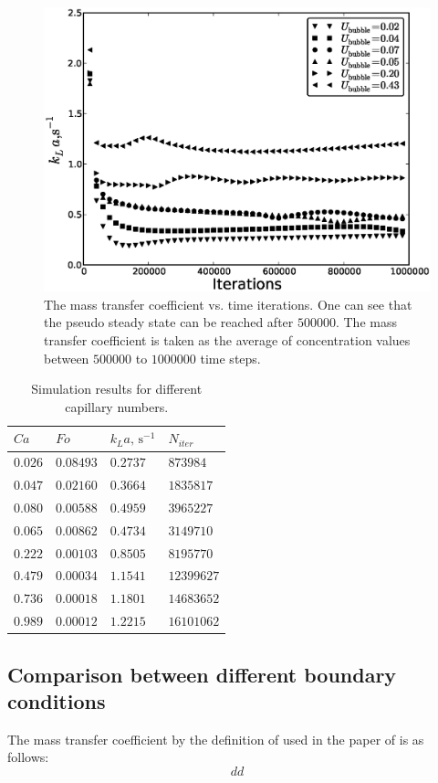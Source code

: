 \documentclass{article}
\begin{document}
\begin{figure}[htb!]
\includegraphics[width=\textwidth]{Figures/steady_state.eps}
\caption{The mass transfer coefficient vs. time iterations. One can see that the pseudo steady
state can be reached after $500000$. The mass transfer coefficient is taken as the average of
concentration values between $500000$ to $1000000$ time steps.\label{fig:steady:state}}
\end{figure}
\begin{table}[htb!]
\begin{tabularx}{\textwidth}{|X|X|X|X|}
\hline
$Ca$&$Fo$&$k_L a,\,\mathrm{s}^{-1}$&$N_{iter}$\\
\hline
$0.026$&$0.08493$&$0.2737$&$873984$\\
$0.047$&$0.02160$&$0.3664$&$1835817$\\
$0.080$&$0.00588$&$0.4959$&$3965227$\\
$0.065$&$0.00862$&$0.4734$&$3149710$\\
$0.222$&$0.00103$&$0.8505$&$8195770$\\
$0.479$&$0.00034$&$1.1541$&$12399627$\\
$0.736$&$0.00018$&$1.1801$&$14683652$\\
$0.989$&$0.00012$&$1.2215$&$16101062$\\
\hline
\end{tabularx}
\caption{Simulation results for different capillary numbers. \label{table:volumetric:coefficients}}
\end{table}

\subsection{Comparison between different boundary conditions}
The mass transfer coefficient by the definition of used in the paper of \citet{vanbaten-circular} is
as
follows:
\begin{equation}
dd
\end{equation}
\end{document}
